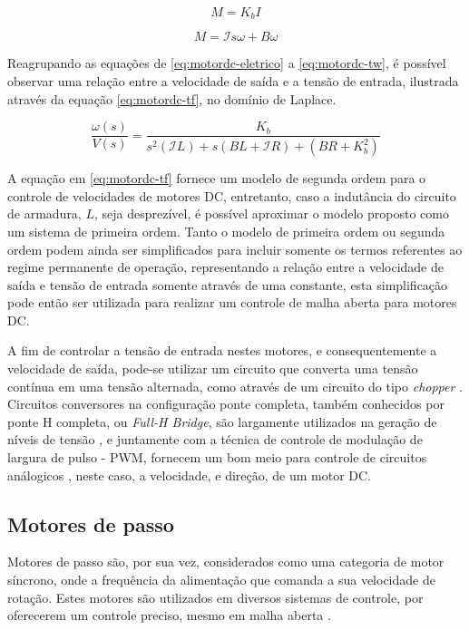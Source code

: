 \begin{equation}
    \label{eq:motordc-torque}
    M = K_b I
\end{equation}

\begin{equation}
    \label{eq:motordc-tw}
    M = \mathcal{I}s\omega + B\omega
\end{equation}

Reagrupando as equações de \ref{eq:motordc-eletrico} a \ref{eq:motordc-tw},
é possível observar uma relação entre a velocidade de saída e a tensão
de entrada, ilustrada através da equação \ref{eq:motordc-tf}, no domínio 
de Laplace.

\begin{equation}
    \label{eq:motordc-tf}
    \frac{\omega(s)}{V(s)} = \frac{K_b}{s^2(\mathcal{I}L)+s(BL+\mathcal{I}R)+(BR+K_b^2)}
\end{equation}

A equação em \ref{eq:motordc-tf} fornece um modelo de segunda ordem para
o controle de velocidades de motores DC, entretanto, caso a indutância
do circuito de armadura, $L$, seja desprezível, é possível aproximar 
o modelo proposto como um sistema de primeira ordem. Tanto o modelo de primeira
ordem ou segunda ordem podem ainda ser simplificados para incluir somente os 
termos referentes ao regime permanente de operação, representando a relação
entre a velocidade de saída e tensão de entrada somente através de uma 
constante, esta simplificação pode então ser utilizada para realizar 
um controle de malha aberta para motores DC.

A fim de controlar a tensão de entrada nestes motores, e consequentemente 
a velocidade de saída, pode-se utilizar um circuito que converta uma tensão
contínua em uma tensão alternada, como através de um circuito do tipo 
\textit{chopper} \cite{krishnan2001electric}.
Circuitos conversores na configuração ponte completa, também conhecidos por 
ponte H completa, ou \textit{Full-H Bridge}, são largamente utilizados na 
geração de níveis de tensão \cite{rashid2017power}, e juntamente com a técnica de controle de 
modulação de largura de pulso - PWM, fornecem um bom meio para controle de 
circuitos análogicos \cite{barr2001pulse}, neste caso, a velocidade, e direção, de um motor DC.

\subsection{Motores de passo}
Motores de passo são, por sua vez, considerados como uma categoria de
motor síncrono, onde a frequência da alimentação que comanda a sua 
velocidade de rotação. Estes motores são utilizados em diversos sistemas
de controle, por oferecerem um controle preciso, mesmo em malha 
aberta \cite{chapman2005electric}.  


